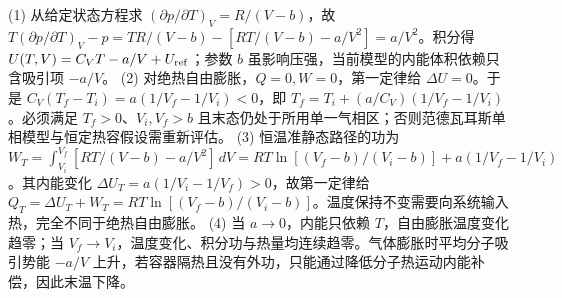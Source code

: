 (1) 从给定状态方程求 \((\partial p/\partial T)_V=R/(V-b)\)，故 \(T(\partial p/\partial T)_V-p=T R/(V-b)-[RT/(V-b)-a/V^2]=a/V^2\)。积分得 \(U(T,V)=C_V T-a/V+U_{\rm ref}\)；参数 \(b\) 虽影响压强，当前模型的内能体积依赖只含吸引项 \(-a/V\)。
(2) 对绝热自由膨胀，\(Q=0,W=0\)，第一定律给 \(\Delta U=0\)。于是 \(C_V(T_f-T_i)=a(1/V_f-1/V_i)<0\)，即 \(T_f=T_i+(a/C_V)(1/V_f-1/V_i)\)。必须满足 \(T_f>0\)、\(V_i,V_f>b\) 且末态仍处于所用单一气相区；否则范德瓦耳斯单相模型与恒定热容假设需重新评估。
(3) 恒温准静态路径的功为 \(W_T=\int_{V_i}^{V_f}[RT/(V-b)-a/V^2]\,dV=RT\ln[(V_f-b)/(V_i-b)]+a(1/V_f-1/V_i)\)。其内能变化 \(\Delta U_T=a(1/V_i-1/V_f)>0\)，故第一定律给 \(Q_T=\Delta U_T+W_T=RT\ln[(V_f-b)/(V_i-b)]\)。温度保持不变需要向系统输入热，完全不同于绝热自由膨胀。
(4) 当 \(a\to0\)，内能只依赖 \(T\)，自由膨胀温度变化趋零；当 \(V_f\to V_i\)，温度变化、积分功与热量均连续趋零。气体膨胀时平均分子吸引势能 \(-a/V\) 上升，若容器隔热且没有外功，只能通过降低分子热运动内能补偿，因此末温下降。
